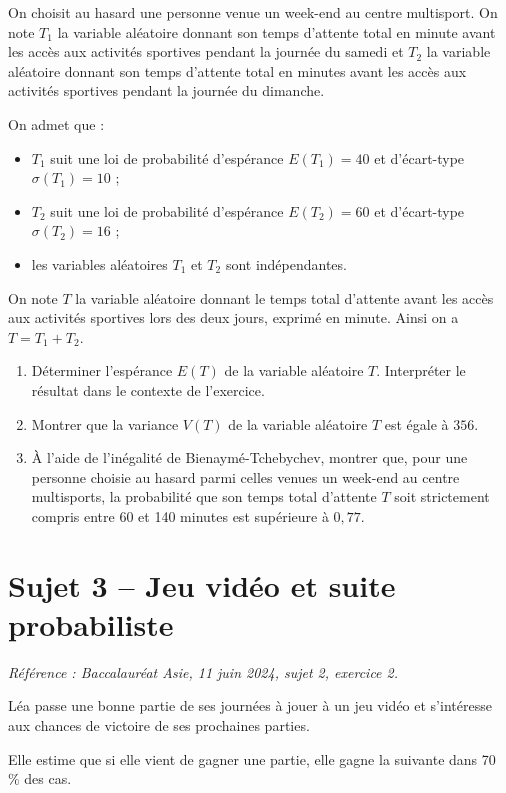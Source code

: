 \documentclass[11pt,a4paper]{article}
\begin{document}
On choisit au hasard une personne venue un week-end au centre multisport. On note $T_1$ la variable aléatoire donnant son temps d'attente total en minute avant les accès aux activités sportives pendant la journée du samedi et $T_2$ la variable aléatoire donnant son temps d'attente total en minutes avant les accès aux activités sportives pendant la journée du dimanche.

On admet que :
\begin{itemize}
  \item $T_1$ suit une loi de probabilité d'espérance $E(T_1)=40$ et d'écart-type $\sigma(T_1)=10$ ;
  \item $T_2$ suit une loi de probabilité d'espérance $E(T_2)=60$ et d'écart-type $\sigma(T_2)=16$ ;
  \item les variables aléatoires $T_1$ et $T_2$ sont indépendantes.
\end{itemize}

On note $T$ la variable aléatoire donnant le temps total d'attente avant les accès aux activités sportives lors des deux jours, exprimé en minute. Ainsi on a $T=T_1+T_2$.

\begin{enumerate}
  \item Déterminer l'espérance $E(T)$ de la variable aléatoire $T$. Interpréter le résultat dans le contexte de l'exercice.
\item Montrer que la variance $V(T)$ de la variable aléatoire $T$ est égale à $356$.
\item À l'aide de l'inégalité de Bienaymé-Tchebychev, montrer que, pour une personne choisie au hasard parmi celles venues un week-end au centre multisports, la probabilité que son temps total d'attente $T$ soit strictement compris entre 60 et 140 minutes est supérieure à $0{,}77$.
\end{enumerate}

\newpage

\section*{Sujet 3 -- Jeu vidéo et suite probabiliste}
{\small\emph{Référence : Baccalauréat Asie, 11 juin 2024, sujet 2, exercice 2.}}

Léa passe une bonne partie de ses journées à jouer à un jeu vidéo et s'intéresse aux chances de victoire de ses prochaines parties.

Elle estime que si elle vient de gagner une partie, elle gagne la suivante dans 70 \% des cas.
\end{document}
